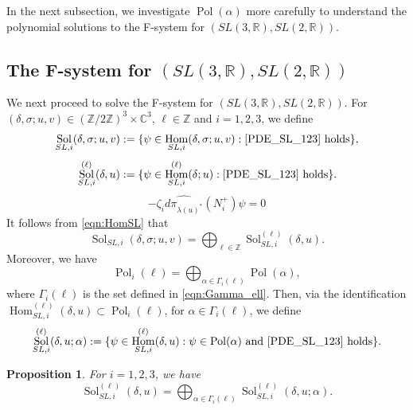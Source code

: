\documentclass[a4paper,11pt,reqno]{amsart}
\newcommand{\0}{{\bf 0}}
\newcommand{\Z}{\mathbb{Z}}
\newcommand{\R}{\mathbb{R}}
\newcommand{\C}{\mathbb{C}}
\newcommand{\1}{{\bf 1}}
\DeclareMathOperator{\Hom}{Hom}
\DeclareMathOperator{\Pol}{Pol}
\DeclareMathOperator{\Sol}{Sol}
\theoremstyle{plain}
\newtheorem{proposition}[equation]{Proposition}
\theoremstyle{definition}
\numberwithin{equation}{section}
\theoremstyle{definition}
\begin{document}
In the next subsection, we investigate $\Pol(\alpha)$ more carefully to understand
the polynomial solutions to the F-system for $(SL(3,\R), SL(2,\R))$.

\subsection{The F-system for \texorpdfstring{$(SL(3,\R), SL(2,\R))$}{(SL(3,R),SL(2,R))}}
\label{sec:DiffEqSL}

We next proceed to solve the F-system for $(SL(3,\R), SL(2,\R))$.
For $(\delta,\sigma; u, v) \in (\Z/2\Z)^3\times \C^3$, $\ell \in \Z$ and $i=1,2,3$, 
we define 
\begin{align*}
\Sol_{SL,i}(\delta,\sigma; u, v)
&:= \{ \psi \in \Hom_{SL,i}(\delta,\sigma; u, v): \text{\eqref{PDE_SL_123} holds}\},\\[3pt]
\Sol_{SL,i}^{(\ell)}(\delta,u) 
&:= \{ \psi \in \Hom^{(\ell)}_{SL,i}(\delta; u):\text{\eqref{PDE_SL_123} holds}\}.
\end{align*}
\begin{equation}\label{PDE_SL_123}
-\zeta_i\widehat{d\pi_{\lambda(u)^*}}(N_i^+)\psi = 0
\end{equation}
It follows from \eqref{eqn:HomSL} that 
\begin{equation}\label{eqn:SolDecompSL}
\Sol_{SL,i}(\delta,\sigma; u, v) 
= \bigoplus_{\ell\in \Z}\Sol_{SL,i}^{(\ell)}(\delta,u).
\end{equation}
Moreover, we have
\begin{equation}\label{eqn:PolSL}
\Pol_i(\ell)
=
\bigoplus_{\alpha \in \Gamma_i(\ell)}
\Pol(\alpha),
\end{equation}
where $\Gamma_i(\ell)$ is the set defined in \eqref{eqn:Gamma_ell}.
Then, via the identification $\Hom_{SL,i}^{(\ell)}(\delta,u) \subset \Pol_i(\ell)$, 
for $\alpha \in \Gamma_i(\ell)$, we define
\begin{equation*}
\Sol_{SL,i}^{(\ell)}(\delta, u;\alpha)
:=\{\psi \in \Hom_{SL,i}^{(\ell)}(\delta,u): 
\text{$\psi \in \Pol(\alpha)$ and \eqref{PDE_SL_123} holds}\}.
\end{equation*}

\begin{proposition}\label{prop:SolSLi}
For $i =1,2,3$, we have
\begin{equation*}
\Sol_{SL,i}^{(\ell)}(\delta,u)
=\bigoplus_{\alpha \in \Gamma_i(\ell)} 
\Sol_{SL,i}^{(\ell)}(\delta, u;\alpha).
\end{equation*}
\end{proposition}
\end{document}
